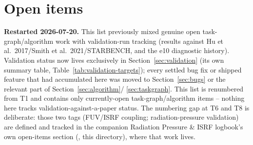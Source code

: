 \section{Open items}
\label{sec:open}

\textbf{Restarted 2026-07-20.} This list previously mixed genuine open
task-graph/algorithm work with validation-run tracking (results
against Hu et al.\ 2017/Smith et al.\ 2021/STARBENCH, and the e10
diagnostic history). Validation status now lives exclusively in
Section~\ref{sec:validation} (its own summary table,
Table~\ref{tab:validation-targets}); every settled bug fix or shipped
feature that had accumulated here was moved to
Section~\ref{sec:bugs} or the relevant part of Section~\ref{sec:algorithm}/
\ref{sec:taskgraph}. This list is renumbered from T1 and contains only
currently-open task-graph/algorithm items -- nothing here tracks
validation-against-a-paper status. The numbering gap at T6 and T8 is
deliberate: those two tags (FUV/ISRF coupling; radiation-pressure
validation) are defined and tracked in the companion Radiation
Pressure \& ISRF logbook's own open-items section
(, this directory), where that
work lives.

